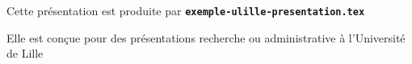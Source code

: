   \item Cette présentation est produite par \texttt{\textbf{exemple-ulille-presentation.tex}}
  \item Elle est conçue pour des présentations recherche ou administrative à l'Université de Lille
